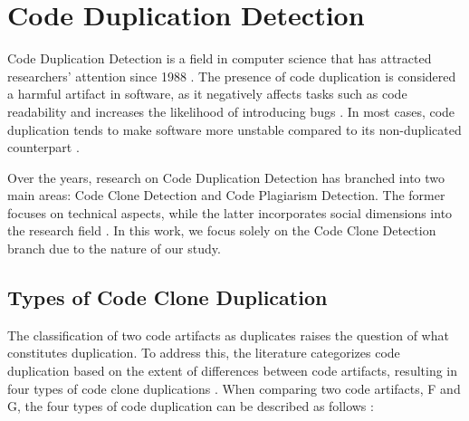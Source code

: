 \en

\section{Code Duplication Detection}

Code Duplication Detection is a field in computer science that has attracted
researchers' attention since 1988 \citep{firstman}. The presence of code
duplication is considered a harmful artifact in software, as it negatively
affects tasks such as code readability and increases the likelihood of
introducing bugs \citep{harmone}. In most cases, code duplication tends to make
software more unstable compared to its non-duplicated counterpart
\citep{harmtwo}.

Over the years, research on Code Duplication Detection has branched into two
main areas: Code Clone Detection and Code Plagiarism Detection. The former
focuses on technical aspects, while the latter incorporates social dimensions
into the research field \citep{litreview}. In this work, we focus solely on the
Code Clone Detection branch due to the nature of our study.

\subsection{Types of Code Clone Duplication}

\label{subsec:types}

The classification of two code artifacts as duplicates raises the question of
what constitutes duplication. To address this, the literature categorizes code
duplication based on the extent of differences between code artifacts,
resulting in four types of code clone duplications \citep{litreview}. When
comparing two code artifacts, F and G, the four types of code duplication can
be described as follows \citep{litreview}:


